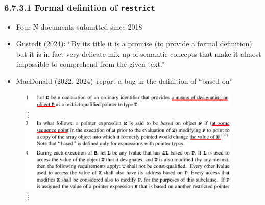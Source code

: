 \begin{frame}
    \frametitle{\textbf{6.7.3.1 Formal definition of} \texttt{restrict}}
\begin{minipage}{0.5\textwidth}
\begin{itemize}
    \item Four N-documents submitted since 2018
    \item {}\ul{Gustedt (2024)}\footnotemark: ``By its title it is a promise (to provide a formal definition) but it is in fact very delicate mix up of semantic concepts that make it almost impossible to comprehend from the given text.'' 
    \item MacDonald \etall (2022, 2024)\footnotemark \ report a bug in the definition of ``based on''
\end{itemize}
\end{minipage}%
\begin{minipage}{0.5\textwidth}
\begin{figure}
\centering
{
\includegraphics[width=0.95\textwidth]{restrict-definition-1-annotated.png}
}
{
\\
\qquad \vdots
\\
}
{
\includegraphics[width=0.95\textwidth]{restrict-definition-3-4-annotated.png}
}
{
\\
\qquad \vdots
}
\end{figure}
\end{minipage}


\end{frame}